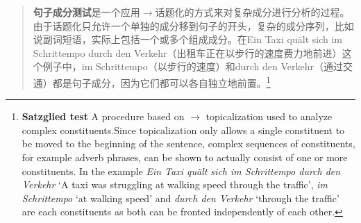 \begin{quotation}
\textbf{句子成分测试}是一个应用$\to$话题化的方式来对复杂成分进行分析的过程。由于话题化只允许一个单独的成分移到句子的开头，复杂的成分序列，比如说副词短语，实际上包括一个或多个组成成分。在Ein Taxi quält sich im Schrittempo durch den Verkehr（出租车正在以步行的速度费力地前进）这个例子中，im Schrittempo（以步行的速度）和durch den Verkehr（通过交通）都是句子成分，因为它们都可以各自独立地前置。\citep[]{Bussmann83a}\footnote{%
\textbf{Satzglied test} A procedure based on $\to$ topicalization used to analyze complex constituents.Since topicalization only allows a single constituent to be moved to the beginning of the sentence, complex sequences of constituents, for example adverb phrases, can be shown to actually consist of one or more constituents. In the example \textit{Ein Taxi quält sich im Schrittempo durch den Verkehr} `A taxi was struggling at walking speed through the traffic', \textit{im Schrittempo} `at walking speed' and \textit{durch den Verkehr} `through the traffic' are each constituents as both can be fronted independently of each other.}
\end{quotation}

